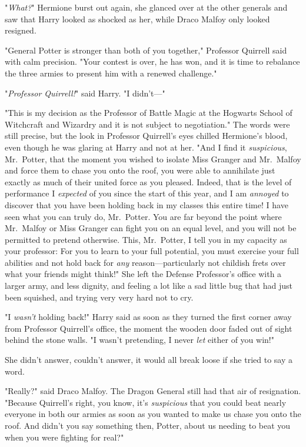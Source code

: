 "\emph{What?}" Hermione burst out again, she glanced over at the other generals 
and saw that Harry looked as shocked as her, while Draco Malfoy only looked 
resigned.

"General Potter is stronger than both of you together," Professor Quirrell said 
with calm precision. "Your contest is over, he has won, and it is time to 
rebalance the three armies to present him with a renewed challenge."

"\emph{Professor Quirrell!}" said Harry. "I didn't---"

"This is my decision as the Professor of Battle Magic at the Hogwarts School of 
Witchcraft and Wizardry and it is not subject to negotiation." The words were 
still precise, but the look in Professor Quirrell's eyes chilled Hermione's 
blood, even though he was glaring at Harry and not at her. "And I find it 
\emph{suspicious}, Mr.~Potter, that the moment you wished to isolate Miss 
Granger and Mr.~Malfoy and force them to chase you onto the roof, you were able 
to annihilate just exactly as much of their united force as you pleased. 
Indeed, that is the level of performance I \emph{expected} of you since the 
start of this year, and I am \emph{annoyed} to discover that you have been 
holding back in my classes this entire time! I have seen what you can truly do, 
Mr.~Potter. You are far beyond the point where Mr.~Malfoy or Miss Granger can 
fight you on an equal level, and you will not be permitted to pretend 
otherwise. This, Mr.~Potter, I tell you in my capacity as your professor: For 
you to learn to your full potential, you must exercise your full abilities and 
not hold back for \emph{any} reason---particularly not childish frets over what 
your friends might think!"
\sbreak
She left the Defense Professor's office with a larger army, and less dignity, 
and feeling a lot like a sad little bug that had just been squished, and trying 
very very hard not to cry.

"I \emph{wasn't} holding back!" Harry said as soon as they turned the first 
corner away from Professor Quirrell's office, the moment the wooden door faded 
out of sight behind the stone walls. "I wasn't pretending, I never \emph{let} 
either of you win!"

She didn't answer, couldn't answer, it would all break loose if she tried to 
say a word.

"Really?" said Draco Malfoy. The Dragon General still had that air of 
resignation. "Because Quirrell's right, you know, it's \emph{suspicious} that 
you could beat nearly everyone in both our armies as soon as you wanted to make 
us chase you onto the roof. And didn't you say something then, Potter, about us 
needing to beat you when you were fighting for real?"

